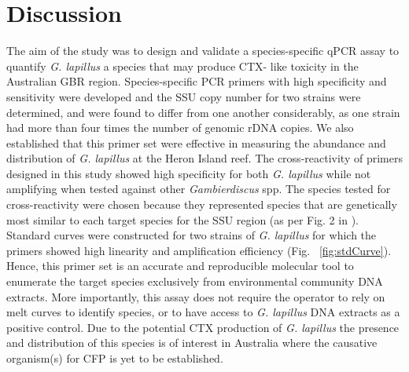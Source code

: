 \documentclass[12pt]{article}
\begin{document}
\section*{Discussion}
The aim of the study was to design and validate a species-specific qPCR assay to quantify \emph{G. lapillus} %
a species that may produce CTX- like toxicity in the Australian GBR region. 
Species-specific PCR primers with high specificity and sensitivity were developed and the SSU copy number for two strains were determined, and were found to differ from one another considerably, as one strain had more than four times the number of genomic rDNA copies. 
We also established that this primer set were effective in measuring the abundance and distribution of %
\textit{G. lapillus} at the Heron Island reef.
The cross-reactivity of primers designed in this study showed high specificity for both \emph{G. lapillus} %
while not amplifying when tested against other \emph{Gambierdiscus} spp. 
The species tested for cross-reactivity were chosen because they represented species that are genetically most similar to each target species for the SSU region (as per Fig. 2 in \citep{kretzschmar2017characterization}).
Standard curves were constructed for two strains of \emph{G. lapillus} %
for which the primers showed high linearity and amplification efficiency (Fig. ~\ref{fig:stdCurve}). 
Hence, this primer set is an accurate and reproducible molecular tool to enumerate the target species exclusively from environmental community DNA extracts. 
More importantly, %
this assay does not require the operator to rely on melt curves to identify species, or to have access to \emph{G. lapillus} %
DNA extracts as a positive control. 
Due to the potential CTX production of \emph{G. lapillus} \citep{kretzschmar2017characterization,larsson2018toxicology} %
the presence and distribution of this species is of interest in Australia where the causative organism(s) for CFP is yet to be established.\\
\end{document}
